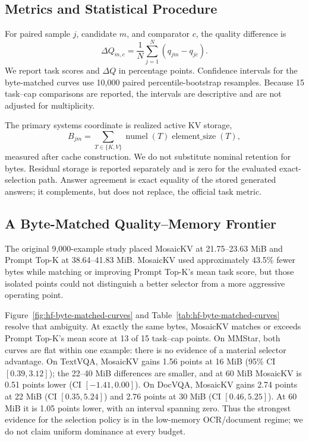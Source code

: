 \subsection{Metrics and Statistical Procedure}
\label{sec:eval-metrics}

For paired sample \(j\), candidate \(m\), and comparator \(c\), the quality
difference is
\begin{equation}
  \Delta Q_{m,c}=\frac{1}{N}\sum_{j=1}^{N}
  \left(q_{jm}-q_{jc}\right).
\end{equation}
We report task scores and \(\Delta Q\) in percentage points.  Confidence
intervals for the byte-matched curves use 10,000 paired percentile-bootstrap
resamples.  Because 15 task--cap comparisons are reported, the intervals are
descriptive and are not adjusted for multiplicity.

The primary systems coordinate is realized active KV storage,
\begin{equation}
  B_{jm}=\sum_{T\in\{K,V\}} \operatorname{numel}(T)
  \operatorname{element\_size}(T),
\end{equation}
measured after cache construction.  We do not substitute nominal retention
for bytes.  Residual storage is reported separately and is zero for the
evaluated exact-selection path.  Answer agreement is exact equality of the
stored generated answers; it complements, but does not replace, the official
task metric.

\subsection{A Byte-Matched Quality--Memory Frontier}
\label{sec:eval-byte-matched}

The original 9,000-example study placed MosaicKV at 21.75--23.63 MiB and
Prompt Top-K at 38.64--41.83 MiB.  MosaicKV used approximately 43.5\% fewer
bytes while matching or improving Prompt Top-K's mean task score, but those
isolated points could not distinguish a better selector from a more
aggressive operating point.

Figure~\ref{fig:hf-byte-matched-curves} and
Table~\ref{tab:hf-byte-matched-curves} resolve that ambiguity.  At exactly
the same bytes, MosaicKV matches or exceeds Prompt Top-K's mean score at 13
of 15 task--cap points.  On MMStar, both curves are flat within one example:
there is no evidence of a material selector advantage.  On TextVQA,
MosaicKV gains 1.56 points at 16 MiB
(95\% CI \([0.39,3.12]\)); the 22--40 MiB differences are smaller, and at
60 MiB MosaicKV is 0.51 points lower (CI \([-1.41,0.00]\)).  On DocVQA,
MosaicKV gains 2.74 points at 22 MiB (CI \([0.35,5.24]\)) and 2.76 points at
30 MiB (CI \([0.46,5.25]\)).  At 60 MiB it is 1.05 points lower, with an
interval spanning zero.  Thus the strongest evidence for the selection
policy is in the low-memory OCR/document regime; we do not claim uniform
dominance at every budget.

